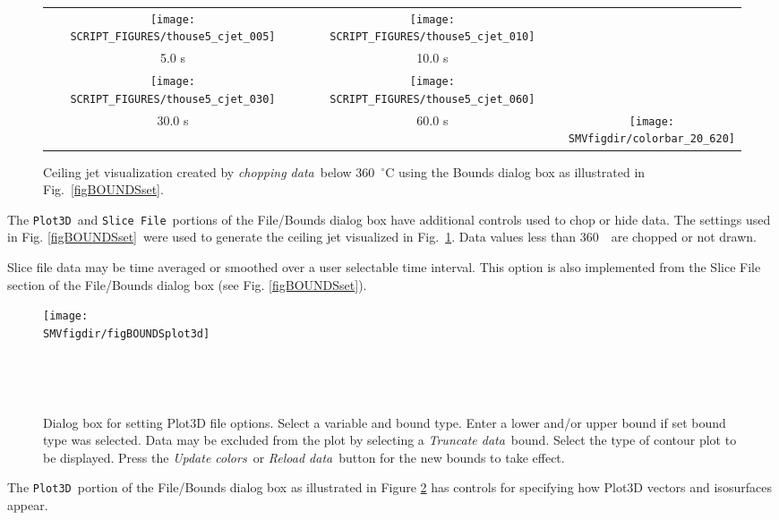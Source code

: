 \documentclass[11pt,twoside]{book}
\newcommand{\figheightAbar}{2.2in}
\begin{document}
\begin{figure}[bph]
\begin{center}
\begin{tabular}{ccc}
\texttt{[image: SCRIPT\_FIGURES/thouse5\_cjet\_005]}&
\texttt{[image: SCRIPT\_FIGURES/thouse5\_cjet\_010]}\\
5.0 s&10.0 s\\
\texttt{[image: SCRIPT\_FIGURES/thouse5\_cjet\_030]}&
\texttt{[image: SCRIPT\_FIGURES/thouse5\_cjet\_060]}&\\
30.0 s&60.0 s
&\raisebox{0.0ex}[0pt]{\texttt{[image: \\SMVfigdir/colorbar\_20\_620]}}\\
\end{tabular}
\caption [Ceiling Jet Visualization.] {   Ceiling jet
visualization created by {\em chopping data}\ below 360~$^\circ$C
using the Bounds dialog box as illustrated in
Fig.~\ref{figBOUNDSset}. }
\label{figceilingjet}%
\end{center}
\end{figure}

The {\tt Plot3D}\ and {\tt Slice File}\ portions of the
File/Bounds dialog box have additional controls used to chop or
hide data. The settings used in Fig. \ref{figBOUNDSset}\ were
used to generate the ceiling jet visualized in
Fig.~\ref{figceilingjet}. Data values less than 360~\degC\ are
chopped or not drawn.

Slice file data may be time averaged or smoothed over a user
selectable time interval.  This option is also implemented from
the Slice File section of the File/Bounds dialog box (see
Fig. \ref{figBOUNDSset}).

\begin{figure}[bph]
\centerline{
\texttt{[image: \\SMVfigdir/figBOUNDSplot3d]}
}\ \caption[Dialog box for setting Plot3D file
options.] {Dialog box for setting Plot3D file
options. Select a variable and bound type. Enter a lower
and/or upper bound if set bound type was selected.  Data may be excluded from the plot by
selecting a {\em Truncate data}\ bound. Select the type of contour
plot to be displayed. Press the {\em Update colors}\ or {\em Reload data}\ button for
the new bounds to take effect.}\ \label{figBOUNDSplot3d}
\end{figure}

The {\tt Plot3D}\ portion of the File/Bounds dialog box as illustrated in Figure \ref{figBOUNDSplot3d} has controls for specifying how Plot3D vectors and isosurfaces appear.
\end{document}
